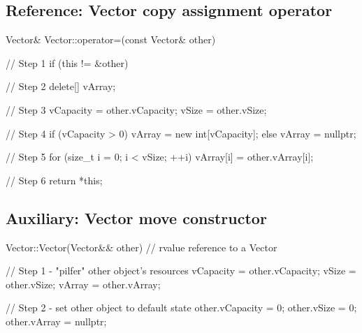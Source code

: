 \documentclass{report}
\begin{document}
    \bigbreak \noindent 
    \subsection{Reference: Vector copy assignment operator}
    \bigbreak \noindent 
    \begin{cppcode}
        Vector& Vector::operator=(const Vector& other)
        {
            // Step 1
        if (this != &other)
        {
            // Step 2
            delete[] vArray;

            // Step 3
            vCapacity = other.vCapacity;
            vSize = other.vSize;

            // Step 4
            if (vCapacity > 0)
            vArray = new int[vCapacity];
            else
            vArray = nullptr;


            // Step 5
            for (size_t i = 0; i < vSize; ++i)
            vArray[i] = other.vArray[i];
        }

        // Step 6
        return *this;
    }
    \end{cppcode}

    \bigbreak \noindent 
    \subsection{Auxiliary: Vector move constructor}
    \bigbreak \noindent 
    \begin{cppcode}
        Vector::Vector(Vector&& other)    // rvalue reference to a Vector
        {
            // Step 1 - "pilfer" other object's resources
            vCapacity = other.vCapacity;
            vSize = other.vSize;
            vArray = other.vArray;

            // Step 2 - set other object to default state
            other.vCapacity = 0;
            other.vSize = 0;
            other.vArray = nullptr;
        }
    \end{cppcode}

    \pagebreak 
\end{document}
